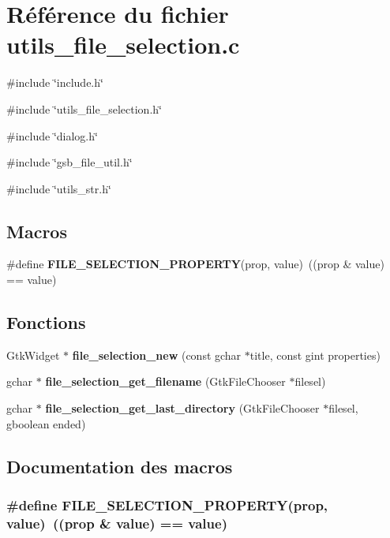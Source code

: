 \section{Référence du fichier utils\_\-file\_\-selection.c}
\label{utils__file__selection_8c}
{\ttfamily \#include \char`\"{}include.h\char`\"{}}\par
{\ttfamily \#include \char`\"{}utils\_\-file\_\-selection.h\char`\"{}}\par
{\ttfamily \#include \char`\"{}dialog.h\char`\"{}}\par
{\ttfamily \#include \char`\"{}gsb\_\-file\_\-util.h\char`\"{}}\par
{\ttfamily \#include \char`\"{}utils\_\-str.h\char`\"{}}\par
\subsection*{Macros}
\begin{DoxyCompactItemize}
\item 
\#define {\bf FILE\_\-SELECTION\_\-PROPERTY}(prop, value)~((prop \& value) == value)
\end{DoxyCompactItemize}
\subsection*{Fonctions}
\begin{DoxyCompactItemize}
\item 
GtkWidget $\ast$ {\bf file\_\-selection\_\-new} (const gchar $\ast$title, const gint properties)
\item 
gchar $\ast$ {\bf file\_\-selection\_\-get\_\-filename} (GtkFileChooser $\ast$filesel)
\item 
gchar $\ast$ {\bf file\_\-selection\_\-get\_\-last\_\-directory} (GtkFileChooser $\ast$filesel, gboolean ended)
\end{DoxyCompactItemize}


\subsection{Documentation des macros}
\subsubsection[{FILE\_\-SELECTION\_\-PROPERTY}]{\setlength{\rightskip}{0pt plus 5cm}\#define FILE\_\-SELECTION\_\-PROPERTY(prop, \/  value)~((prop \& value) == value)}\label{utils__file__selection_8c_abc5a5d014000db2404f60f3615ae8766}


